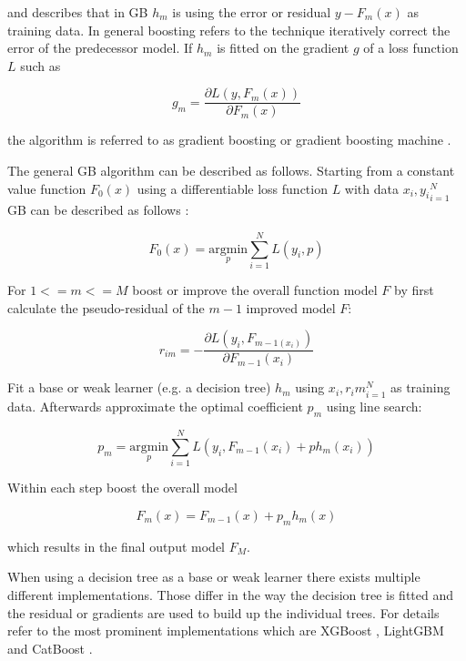 \documentclass[../main.tex]{subfiles}
\begin{document}
and describes that in GB $h_m$ is using the error or residual $y-F_m(x)$ as training data. In general boosting refers to the technique iteratively correct the error of the predecessor model. If $h_m$ is fitted on the gradient $g$ of a loss function $L$ such as

\begin{equation}
    g_m=\frac{\partial L(y, F_m(x))}{\partial F_m(x)}
\end{equation}

the algorithm is referred to as gradient boosting or gradient boosting machine \cite{friedman_greedy_2001}.

The general GB algorithm can be described as follows. Starting from a constant value function $F_0(x)$ using a differentiable loss function $L$ with data ${x_i, y_i}_{i=1}^{N}$ GB can be described as follows \cite{friedman_greedy_2001}:

\begin{equation}
    F_0(x)=\underset{p}{\mathrm{argmin}}\sum_{i=1}^{N}L(y_i,p) 
\end{equation}

For $1<=m<=M$ boost or improve the overall function model $F$ by first calculate the pseudo-residual of the $m-1$ improved model $F$:

\begin{equation}
    r_{im}=-\frac{\partial L(y_i,F_{m-1(x_i)})}{\partial F_{m-1}(x_i)}
\end{equation}

Fit a base or weak learner (e.g. a decision tree) $h_m$ using ${x_i, r_im}_{i=1}^{N}$ as training data. Afterwards approximate the optimal coefficient $p_m$ using line search:

\begin{equation}
    p_m=\underset{p}{\mathrm{argmin}}\sum_{i=1}^{N}L(y_i,F_{m-1}(x_i)+p h_m(x_i))
\end{equation}

Within each step boost the overall model 

\begin{equation} \label{eq:gb_update}
    F_m(x)=F_{m-1}(x)+p_mh_m(x)
\end{equation}

which results in the final output model $F_M$.

When using a decision tree as a base or weak learner there exists multiple different implementations. Those differ in the way the decision tree is fitted and the residual or gradients are used to build up the individual trees. For details refer to the most prominent implementations which are XGBoost \cite{chen_xgboost_2016}, LightGBM \cite{ke_lightgbm_2017} and CatBoost \cite{prokhorenkova_catboost_2019}.
\end{document}
